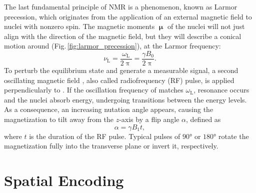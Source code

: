 The last fundamental principle of NMR is a phenomenon, known as Larmor precession, which originates from the application of an external magnetic field to nuclei with nonzero spin. The magnetic moments $\bm{\upmu}$ of the nuclei will not just align with the direction of the magnetic field, but they will describe a conical motion around  (Fig.\,\ref{fig:larmor_precession}), at the Larmor frequency:
\begin{equation}
    \nu_\textrm{L} = \frac{\omega_\textrm{L}}{2\uppi} = \frac{\gamma B_0}{2\uppi}.
\end{equation}
To perturb the equilibrium state and generate a measurable signal, a second oscillating magnetic field , also called radiofrequency (RF) pulse, is applied perpendicularly to . If the oscillation frequency of  matches $\omega_\mathrm{L}$, resonance occurs and the nuclei absorb energy, undergoing transitions between the energy levels. As a consequence, an increasing nutation angle appears, causing the magnetization  to tilt away from the $z$-axis by a flip angle $\alpha$, defined as
\begin{equation}
    \alpha = \gamma B_1 t,
\end{equation}
where $t$ is the duration of the RF pulse. Typical pulses of $90$° or $180$° rotate the magnetization fully into the transverse plane or invert it, respectively.

\section{Spatial Encoding}

